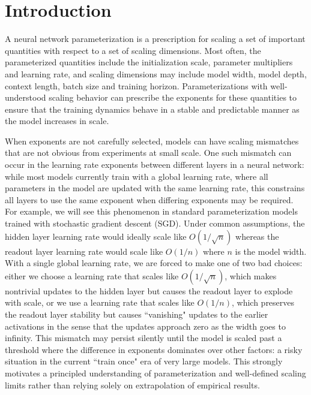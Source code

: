 \documentclass{article}
\theoremstyle{plain}
\theoremstyle{definition}
\theoremstyle{remark}
\begin{document}
    





\vspace{-16pt}
\section{Introduction} 
\label{introduction}

A neural network parameterization is a prescription for scaling a set of important quantities with respect to a set of scaling dimensions. Most often, the parameterized quantities include the initialization scale, parameter multipliers and learning rate, and scaling dimensions may include model width, model depth, context length, batch size and training horizon. Parameterizations with well-understood scaling behavior can prescribe the exponents for these quantities to ensure that the training dynamics behave in a stable and predictable manner as the model increases in scale.


When exponents are not carefully selected, models can have scaling mismatches that are not obvious from experiments at small scale. One such mismatch can occur in the learning rate exponents between different layers in a neural network: while most models currently train with a global learning rate, where all parameters in the model are updated with the same learning rate, this constrains all layers to use the same exponent when differing exponents may be required. For example, we will see this phenomenon in standard parameterization models trained with stochastic gradient descent (SGD). Under common assumptions, the hidden layer learning rate would ideally scale like $O(1/\sqrt{n})$ whereas the readout layer learning rate would scale like $O(1/n)$ where $n$ is the model width. With a single global learning rate, we are forced to make one of two bad choices: either we choose a learning rate that scales like $O(1/\sqrt{n})$, which makes nontrivial updates to the hidden layer but causes the readout layer to explode with scale, or we use a learning rate that scales like $O(1/n)$, which preserves the readout layer stability but causes ``vanishing" updates to the earlier activations in the sense that the updates approach zero as the width goes to infinity. This mismatch may persist silently until the model is scaled past a threshold where the difference in exponents dominates over other factors: a risky situation in the current ``train once" era of very large models. This strongly motivates a principled understanding of parameterization and well-defined scaling limits rather than relying solely on extrapolation of empirical results.
\end{document}
